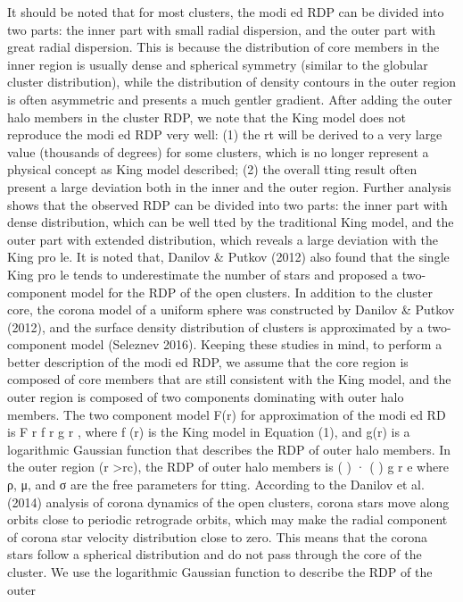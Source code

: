 \documentclass[../main.tex]{subfiles}
\begin{document}
{It should be noted that for most clusters, the modi ed RDP
can be divided into two parts: the inner part with small radial
dispersion, and the outer part with great radial dispersion. This
is because the distribution of core members in the inner region
is usually dense and spherical symmetry (similar to the globular
cluster distribution), while the distribution of density contours
in the outer region is often asymmetric and presents a much
gentler gradient. After adding the outer halo members in the
cluster RDP, we note that the King model does not reproduce
the modi ed RDP very well: (1) the rt will be derived to a very
large value (thousands of degrees) for some clusters, which is
no longer represent a physical concept as King model
described; (2) the overall tting result often present a large
deviation both in the inner and the outer region.
Further analysis shows that the observed RDP can be divided
into two parts: the inner part with dense distribution, which can
be well tted by the traditional King model, and the outer part
with extended distribution, which reveals a large deviation with
the King pro le. It is noted that, Danilov & Putkov (2012) also
found that the single King pro le tends to underestimate the
number of stars and proposed a two-component model for the RDP of the open clusters. In addition to the cluster core,
the corona model of a uniform sphere was constructed by
Danilov & Putkov (2012), and the surface density distribution
of clusters is approximated by a two-component model
(Seleznev 2016). Keeping these studies in mind, to perform a
better description of the modi ed RDP, we assume that the core
region is composed of core members that are still consistent
with the King model, and the outer region is composed of two
components dominating with outer halo members. The two
component model F(r) for approximation of the modi ed RD
is
F r f r g r ,
where f (r) is the King model in Equation (1), and g(r) is a
logarithmic Gaussian function that describes the RDP of outer
halo members. In the outer region (r >rc), the RDP of outer
halo members is
( ) · ( )
g r e
where ρ, μ, and σ are the free parameters for tting.
According to the Danilov et al. (2014) analysis of corona
dynamics of the open clusters, corona stars move along orbits
close to periodic retrograde orbits, which may make the radial
component of corona star velocity distribution close to zero.
This means that the corona stars follow a spherical distribution
and do not pass through the core of the cluster. We use the
logarithmic Gaussian function to describe the RDP of the outer
}
\end{document}
